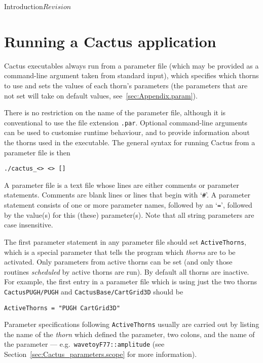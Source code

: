 \begin{cactuspart}{Introduction}{}{$Revision$}

\section{Running a Cactus application}

Cactus executables always run from a parameter file (which may be
provided as a command-line argument taken from standard input), which
specifies which thorns to use and sets the values of each thorn's 
parameters (the parameters that are not set will take on default values, 
see~\ref{sec:Appendix.param}).

There is no restriction on the name
of the parameter file, although it is conventional to use the file
extension \texttt{.par}.  Optional command-line arguments can be used
to customise runtime behaviour, and to provide information about the
thorns used in the executable. The general syntax for running Cactus from
a parameter file is then

\texttt{./cactus\_<> <>
[]}

A parameter file is a text file whose lines are either comments
or parameter statements.
Comments are blank lines or lines that begin with `\texttt{\#}'.
A parameter statement consists of one or more parameter names, followed by
an `\texttt{=}', followed by the value(s) for this (these) parameter(s).
Note that all string parameters are case insensitive.

The first parameter statement in any parameter file should set \texttt{ActiveThorns},
which is a special parameter that tells the
program which \textit{thorns} are to be activated.  Only parameters from active
thorns can be set (and only those routines \textit{scheduled} by active thorns
are run).  By default all thorns are inactive. For example, the first
entry in a parameter file which is using just the two thorns
\texttt{CactusPUGH/PUGH} and \texttt{CactusBase/CartGrid3D} should be

\texttt{ActiveThorns = "PUGH CartGrid3D"}

Parameter specifications following \texttt{ActiveThorns} usually are
carried out by listing
the name of the \textit{thorn} which defined the parameter, two colons,
and the name of the parameter --- e.g.~\texttt{wavetoyF77::amplitude}
(see Section~\ref{sec:Cactus_parameters.scope} for more information).


\end{cactuspart}
